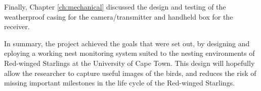 \documentclass[class=report,11pt,crop=false]{standalone}
\begin{document}
Finally, Chapter \ref{ch:mechanical} discussed the design and testing of the weatherproof casing for the camera/transmitter and handheld box for the receiver. 

In summary, the project achieved the goals that were set out, by designing and eploying a working nest monitoring system suited to the nesting environments of Red-winged Starlings at the University of Cape Town. This design will hopefully allow the researcher to capture useful images of the birds, and reduces the risk of missing important milestones in the life cycle of the Red-winged Starlings. 



\ifstandalone

\printnoidxglossary[type=\acronymtype,nonumberlist]
\fi
\end{document}
